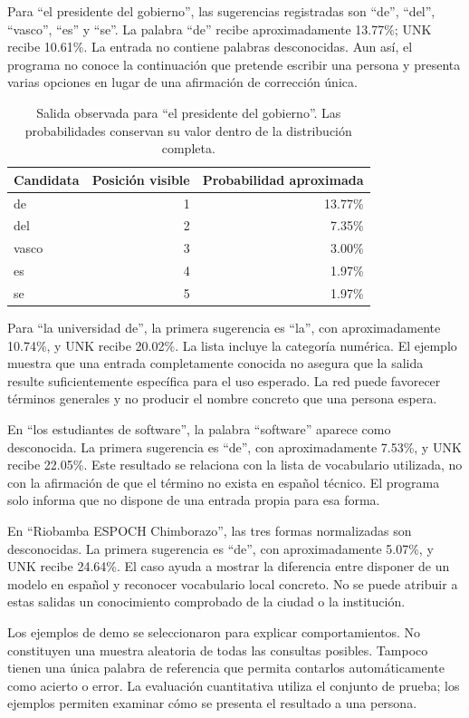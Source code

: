 Para ``el presidente del gobierno'', las sugerencias registradas son ``de'', ``del'', ``vasco'', ``es'' y ``se''. La palabra ``de'' recibe aproximadamente 13.77\%; UNK recibe 10.61\%. La entrada no contiene palabras desconocidas. Aun así, el programa no conoce la continuación que pretende escribir una persona y presenta varias opciones en lugar de una afirmación de corrección única.

\begin{table}[tb]
\caption{Salida observada para ``el presidente del gobierno''. Las probabilidades conservan su valor dentro de la distribución completa.}
\centering
\begin{tabular}{lrr}
\toprule Candidata & Posición visible & Probabilidad aproximada\\\midrule
de & 1 & 13.77\%\\
del & 2 & 7.35\%\\
vasco & 3 & 3.00\%\\
es & 4 & 1.97\%\\
se & 5 & 1.97\%\\\bottomrule
\end{tabular}
\end{table}

Para ``la universidad de'', la primera sugerencia es ``la'', con aproximadamente 10.74\%, y UNK recibe 20.02\%. La lista incluye la categoría numérica. El ejemplo muestra que una entrada completamente conocida no asegura que la salida resulte suficientemente específica para el uso esperado. La red puede favorecer términos generales y no producir el nombre concreto que una persona espera.

En ``los estudiantes de software'', la palabra ``software'' aparece como desconocida. La primera sugerencia es ``de'', con aproximadamente 7.53\%, y UNK recibe 22.05\%. Este resultado se relaciona con la lista de vocabulario utilizada, no con la afirmación de que el término no exista en español técnico. El programa solo informa que no dispone de una entrada propia para esa forma.

En ``Riobamba ESPOCH Chimborazo'', las tres formas normalizadas son desconocidas. La primera sugerencia es ``de'', con aproximadamente 5.07\%, y UNK recibe 24.64\%. El caso ayuda a mostrar la diferencia entre disponer de un modelo en español y reconocer vocabulario local concreto. No se puede atribuir a estas salidas un conocimiento comprobado de la ciudad o la institución.

Los ejemplos de demo se seleccionaron para explicar comportamientos. No constituyen una muestra aleatoria de todas las consultas posibles. Tampoco tienen una única palabra de referencia que permita contarlos automáticamente como acierto o error. La evaluación cuantitativa utiliza el conjunto de prueba; los ejemplos permiten examinar cómo se presenta el resultado a una persona.

